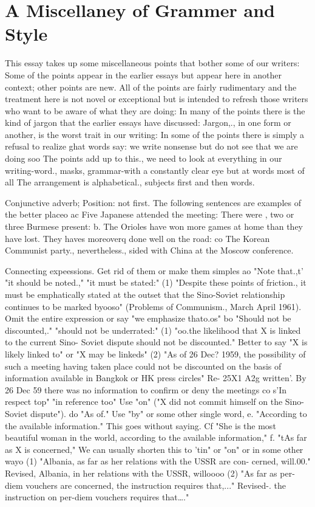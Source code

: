 \documentclass[
    oneside,
    11pt,
    draft
]{memoir}
\begin{document}
\chapter{A Miscellaney of Grammer and Style}

This essay takes up some miscellaneous points that bother some of our writers: Some of the points appear in the earlier essays but appear here in another context; other points are new. All of the points are fairly rudimentary and the treatment here is not novel or exceptional but is intended to refresh those writers who want to be aware of what they are doing: In many of the points there is the kind of jargon that the earlier essays have discussed: Jargon,., in one form or another, is the worst trait in our writing: In some of the points there is simply a refusal to realize ghat words say: we write nonsense but do not see that we are doing soo The points add up to this., we need to look at everything in our writing-word., masks, grammar-with a constantly clear eye but at words most of all The arrangement is alphabetical., subjects first and then words. 

Conjunctive adverb; Position: not first. The following sentences are examples of the better placeo ac Five Japanese attended the meeting: There were , two or three Burmese present: b. The Orioles have won more games at home than they have lost. They haves moreoverq done well on the road: co The Korean Communist party., nevertheless., sided with China at the Moscow conference. 

Connecting expeessions. Get rid of them or make them simples ao "Note that.,t' "it should be noted.," "it must be stated:" (1) "Despite these points of friction., it must be emphatically stated at the outset that the Sino-Soviet relationship continues to be marked byooso" (Problems of Communism., March April 1961). Omit the entire expression or say "we emphasize thato.os" bo "Should not be discounted,." "should not be underrated:" (1) "oo.the likelihood that X is linked to the current Sino- Soviet dispute should not be discounted." Better to say "X is likely linked to" or "X may be linkeds" (2) "As of 26 Dec? 1959, the possibility of such a meeting having taken place could not be discounted on the basis of information available in Bangkok or HK press circles" Re- 25X1 A2g written'. By 26 Dec 59 there was no information to confirm or deny the meetings co s'In respect top" "in reference too" Use "on" ("X did not commit himself on the Sino-Soviet dispute").
do "As of." Use "by" or some other single word, e. "According to the available information." This goes without saying. Cf "She is the most beautiful woman in the world, according to the available information," f. "tAs far as X is concerned," We can usually shorten this to 'tin" or "on" or in some other wayo (1) "Albania, as far as her relations with the USSR are con- cerned, will.00." Revised, Albania, in her relations with the USSR, willoooo (2) "As far as per-diem vouchers are concerned, the instruction requires that,..." Revised-. the instruction on per-diem vouchers requires that\dots." 
\end{document}
